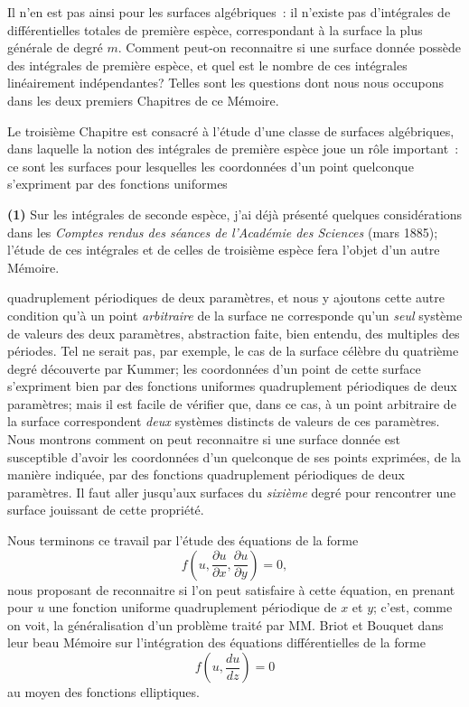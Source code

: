\documentclass{article}
\begin{document}
Il n'en est pas ainsi pour les surfaces algébriques~: il n'existe pas d'intégrales de différentielles totales de première espèce, correspondant à la surface la plus générale de degré $m$. Comment peut-on reconnaitre si une surface donnée possède des intégrales de première espèce, et quel est le nombre de ces intégrales linéairement indépendantes? Telles sont les questions dont nous nous occupons dans les deux premiers Chapitres de ce Mémoire.

Le troisième Chapitre est consacré à l'étude d'une classe de surfaces algébriques, dans laquelle la notion des intégrales de première espèce joue un rôle important~: ce sont les surfaces pour lesquelles les coordonnées d'un point quelconque s'expriment par des fonctions uniformes

\textbf{(1)} Sur les intégrales de seconde espèce, j'ai déjà présenté quelques considérations dans les \emph{Comptes rendus des séances de l'Académie des Sciences} (mars 1885); l'étude de ces intégrales et de celles de troisième espèce fera l'objet d'un autre Mémoire.


quadruplement périodiques de deux paramètres, et nous y ajoutons cette autre condition qu'à un point \emph{arbitraire} de la surface ne corresponde qu'un \emph{seul} système de valeurs des deux paramètres, abstraction faite, bien entendu, des multiples des périodes. Tel ne serait pas, par exemple, le cas de la surface célèbre du quatrième degré découverte par Kummer; les coordonnées d'un point de cette surface s'expriment bien par des fonctions uniformes quadruplement périodiques de deux paramètres; mais il est facile de vérifier que, dans ce cas, à un point arbitraire de la surface correspondent \emph{deux} systèmes distincts de valeurs de ces paramètres. Nous montrons comment on peut reconnaitre si une surface donnée est susceptible d'avoir les coordonnées d'un quelconque de ses points exprimées, de la manière indiquée, par des fonctions quadruplement périodiques de deux paramètres. Il faut aller jusqu'aux surfaces du \emph{sixième} degré pour rencontrer une surface jouissant de cette propriété.

Nous terminons ce travail par l'étude des équations de la forme
\[
f\left(u, \frac{\partial u}{\partial x}, \frac{\partial u}{\partial y}\right) = 0,
\]
nous proposant de reconnaitre si l'on peut satisfaire à cette équation, en prenant pour $u$ une fonction uniforme quadruplement périodique de $x$ et $y$; c'est, comme on voit, la généralisation d'un problème traité par MM. Briot et Bouquet dans leur beau Mémoire sur l'intégration des équations différentielles de la forme
\[
f\left(u, \frac{du}{dz}\right) = 0
\]
au moyen des fonctions elliptiques.
\end{document}
